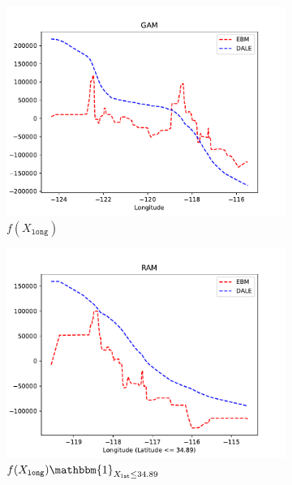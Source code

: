 \documentclass[runningheads]{llncs}
\newcommand{\when}[1]{\mathbbm{1}_{#1}}
\begin{document}
\begin{figure}[htbp]
    \centering
    \begin{subfigure}{0.32\textwidth}
        \centering
        \includegraphics[width=\textwidth]{figures/california_gam}
        \caption{\(f(X_{\mathtt{long}})\)}
        \label{subfig:california_gam}
    \end{subfigure}
    \begin{subfigure}{0.32\textwidth}
        \centering
        \includegraphics[width=\textwidth]{figures/california_ram_1}
        \caption{\(f(X_{\mathtt{long}}) \when{X_{\mathtt{lat}} \leq 34.89}\)}
        \label{subfig:california_ram_1}
    \end{subfigure}
    \begin{subfigure}{0.32\textwidth}

\end{subfigure}
\end{figure}
\end{document}
